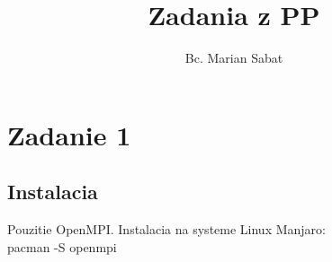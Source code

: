\documentclass{report}
\title{Zadania z PP}
\author{Bc. Marian Sabat}
\begin{document}
\maketitle
\tableofcontents

\chapter{Zadanie 1}
\section{Instalacia}
Pouzitie OpenMPI.
Instalacia na systeme Linux Manjaro:\\
pacman -S openmpi
\end{document}
